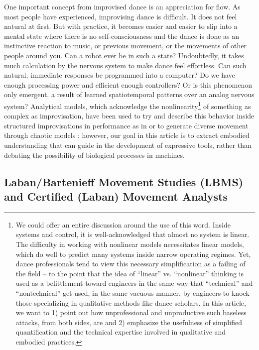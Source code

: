 \documentclass[arts,article,submit,moreauthors,pdftex,10pt,a4paper]{mdpi}
\begin{document}
One important concept from improvised dance is an appreciation for flow. As most people have experienced, improvising dance is difficult. It does not feel natural at first. But with practice, it becomes easier and easier to slip into a mental state where there is no self-consciousness and the dance is done as an instinctive reaction to music, or previous movement, or the movements of other people around you. Can a robot ever be in such a state? Undoubtedly, it takes much calculation by the nervous system to make dance feel effortless. Can such natural, immediate responses be programmed into a computer? Do we have enough processing power and efficient enough controllers? Or is this phenomenon only emergent, a result of learned spatiotemporal patterns over an analog nervous system?  Analytical models, which acknowledge the nonlinearity\footnote{We could offer an entire discussion around the use of this word.  Inside systems and control, it is well-acknowledged that almost no system is linear.  The difficulty in working with nonlinear models necessitates linear models, which do well to predict many systems inside narrow operating regimes.  Yet, dance professionals tend to view this necessary simplification as a failing of the field -- to the point that the idea of ``linear'' vs. ``nonlinear'' thinking is used as a belittlement toward engineers in the same way that ``technical'' and ``nontechnical'' get used, in the same vacuous manner, by engineers to knock those specializing in qualitative methods like dance scholars.  In this article, we want to 1) point out how unprofessional and unproductive such baseless attacks, from both sides, are and 2) emphasize the usefulness of simplified quantification and the technical expertise involved in qualitative and embodied practices.} of something as complex as improvisation, have been used to try and describe this behavior inside structured improvisations in performance as in \cite{ozcimder2016investigating} or to generate diverse movement through chaotic models \cite{chaos}; however, our goal in this article is to extract embodied understanding that can guide in the development of expressive tools, rather than debating the possibility of biological processes in machines.

\subsection{Laban/Bartenieff Movement Studies (LBMS) and Certified (Laban) Movement Analysts}
\end{document}
